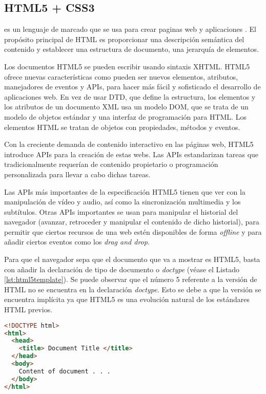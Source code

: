 \subsection{HTML5 + CSS3}

 es un lenguaje de marcado que se usa para crear paginas web y aplicaciones \cite{32}. El propósito principal de \ac{HTML} es proporcionar una descripción semántica del contenido y establecer una estructura de documento, una jerarquía de elementos. 

Los documentos \ac{HTML}5  se pueden escribir usando sintaxis \ac{XHTML}. \ac{HTML}5 ofrece nuevas características como pueden ser nuevos elementos, atributos, manejadores de eventos y \ac{API}s, para hacer más fácil y sofisticado el desarrollo de aplicaciones web. En vez de usar \ac{DTD}, que define la estructura, los elementos y los atributos de un documento \ac{XML} usa un modelo \ac{DOM}, que se trata de un modelo de objetos estándar y una interfaz de programación para HTML. Los elementos HTML se tratan de objetos con propiedades, métodos y eventos.

Con la creciente demanda de contenido interactivo en las páginas web, \ac{HTML}5 introduce \ac{API}s para la creación de estas webs. Las \ac{API}s estandarizan tareas que tradicionalmente requerían de contenido propietario o programación personalizada para llevar a cabo dichas tareas. 

Las \ac{API}s más importantes de la especificación \ac{HTML}5 tienen que ver con la manipulación de vídeo y audio, así como la sincronización multimedia y los subtítulos. Otras \ac{API}s importantes se usan para manipular el historial del navegador (avanzar, retroceder y manipular el contenido de dicho historial), para permitir que ciertos recursos de una web estén disponibles de forma \textit{offline} y para añadir ciertos eventos como los \textit{drag and drop}. 

Para que el navegador sepa que el documento que va a mostrar es \ac{HTML}5, basta con añadir la declaración de tipo de documento o \textit{doctype} (véase el Listado \ref{lst:html5template}). Se puede observar que el número 5 referente a la versión de \ac{HTML} no se encuentra en la declaración \textit{doctype}. Esto se debe a que la versión se encuentra implícita ya que \ac{HTML}5 es una evolución natural de los estándares \ac{HTML} previos.

\begin{lstlisting}[language=html,captionpos=t,caption={\textbf{Esqueleto de código HTML5.}},label={lst:html5template}]
<!DOCTYPE html>
<html>
  <head>
    <title> Document Title </title>
  </head>
  <body>
    Content of document . . .
  </body>
</html>
\end{lstlisting}

